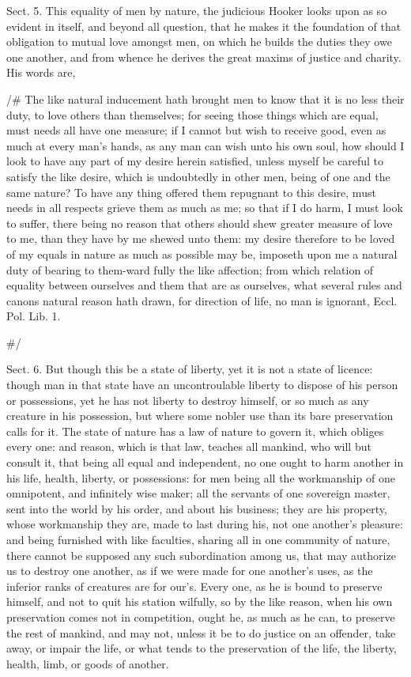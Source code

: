 \documentclass[11pt,openany]{book}
\begin{document}
Sect. 5. This equality of men by nature, the judicious Hooker looks upon as so evident in itself, and beyond all question, that he makes it the foundation of that obligation to mutual love amongst men, on which he builds the duties they owe one another, and from whence he derives the great maxims of justice and charity. His words are,

/\# The like natural inducement hath brought men to know that it is no less their duty, to love others than themselves; for seeing those things which are equal, must needs all have one measure; if I cannot but wish to receive good, even as much at every man's hands, as any man can wish unto his own soul, how should I look to have any part of my desire herein satisfied, unless myself be careful to satisfy the like desire, which is undoubtedly in other men, being of one and the same nature? To have any thing offered them repugnant to this desire, must needs in all respects grieve them as much as me; so that if I do harm, I must look to suffer, there being no reason that others should shew greater measure of love to me, than they have by me shewed unto them: my desire therefore to be loved of my equals in nature as much as possible may be, imposeth upon me a natural duty of bearing to them-ward fully the like affection; from which relation of equality between ourselves and them that are as ourselves, what several rules and canons natural reason hath drawn, for direction of life, no man is ignorant, Eccl. Pol. Lib. 1.

\#/

Sect. 6. But though this be a state of liberty, yet it is not a state of licence: though man in that state have an uncontroulable liberty to dispose of his person or possessions, yet he has not liberty to destroy himself, or so much as any creature in his possession, but where some nobler use than its bare preservation calls for it. The state of nature has a law of nature to govern it, which obliges every one: and reason, which is that law, teaches all mankind, who will but consult it, that being all equal and independent, no one ought to harm another in his life, health, liberty, or possessions: for men being all the workmanship of one omnipotent, and infinitely wise maker; all the servants of one sovereign master, sent into the world by his order, and about his business; they are his property, whose workmanship they are, made to last during his, not one another's pleasure: and being furnished with like faculties, sharing all in one community of nature, there cannot be supposed any such subordination among us, that may authorize us to destroy one another, as if we were made for one another's uses, as the inferior ranks of creatures are for our's. Every one, as he is bound to preserve himself, and not to quit his station wilfully, so by the like reason, when his own preservation comes not in competition, ought he, as much as he can, to preserve the rest of mankind, and may not, unless it be to do justice on an offender, take away, or impair the life, or what tends to the preservation of the life, the liberty, health, limb, or goods of another.
\end{document}
